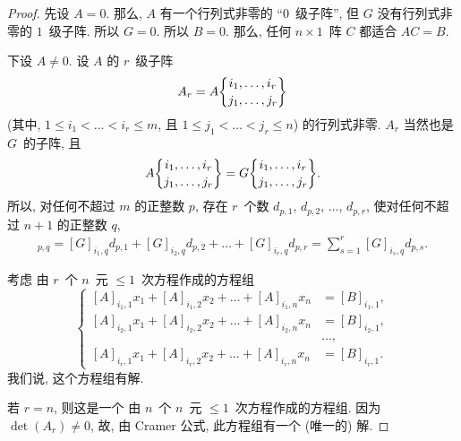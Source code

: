\documentclass[../libro.tex]{subfiles}
\begin{document}
\begin{proof}
    先设 \(A = 0\).
    那么, \(A\) 有一个行列式非零的 ``\(0\)~级子阵'',
    但 \(G\) 没有行列式非零的 \(1\)~级子阵.
    所以 \(G = 0\).
    所以 \(B = 0\).
    那么, 任何 \(n \times 1\)~阵 \(C\)
    都适合 \(AC = B\).

    下设 \(A \neq 0\).
    设 \(A\) 的 \(r\)~级子阵
    \begin{align*}
        A_r = A\submat{i_1,\dots,i_r}{j_1,\dots,j_r}
    \end{align*}
    (其中, %
    \(1 \leq i_1 < \dots < i_r \leq m\),
    且 \(1 \leq j_1 < \dots < j_r \leq n\)) %
    的行列式非零.
    \(A_r\) 当然也是 \(G\)~的子阵, 且
    \begin{align*}
        A\submat{i_1,\dots,i_r}{j_1,\dots,j_r}
        =
        G\submat{i_1,\dots,i_r}{j_1,\dots,j_r}.
    \end{align*}
    所以, 对任何不超过 \(m\) 的正整数 \(p\),
    存在 \(r\)~个数
    \(d_{p,1}\), \(d_{p,2}\), \(\dots\), \(d_{p,r}\),
    使对任何不超过 \(n+1\) 的正整数 \(q\),
    \begin{align*}
        [G]_{p,q}
        = [G]_{i_1,q} d_{p,1}
        + [G]_{i_2,q} d_{p,2}
        + \dots
        + [G]_{i_r,q} d_{p,r}
        =
        \sum_{s = 1}^{r} {[G]_{i_s,q} d_{p,s}}.
    \end{align*}

    考虑%
    由 \(r\)~个 \(n\)~元 \({\leq} 1\)~次方程作成的方程组
    \begin{equation*}
        \left\{ %
        \begin{aligned}
            [A]_{i_1,1} x_1 + [A]_{i_1,2} x_2 + \dots + [A]_{i_1,n} x_n & = [B]_{i_1,1}, \\
            [A]_{i_2,1} x_1 + [A]_{i_2,2} x_2 + \dots + [A]_{i_2,n} x_n & = [B]_{i_2,1}, \\
            & \dots, \\
            [A]_{i_r,1} x_1 + [A]_{i_r,2} x_2 + \dots + [A]_{i_r,n} x_n & = [B]_{i_r,1}.
        \end{aligned}
        \right. %
    \end{equation*}
    我们说, 这个方程组有解.

    若 \(r = n\), 则这是一个%
    由 \(n\)~个 \(n\)~元 \({\leq} 1\)~次方程作成的方程组.
    因为 \(\det {(A_r)} \neq 0\),
    故, 由 Cramer 公式,
    此方程组有一个 (唯一的) 解.


\end{proof}
\end{document}
